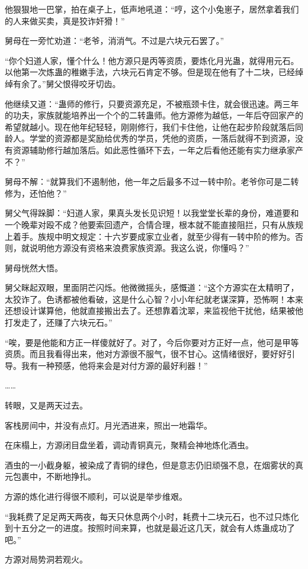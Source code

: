 \begin{this_body}
他狠狠地一巴掌，拍在桌子上，低声地吼道：“哼，这个小兔崽子，居然拿着我们的人来做买卖，真是狡诈奸猾！”

舅母在一旁忙劝道：“老爷，消消气。不过是六块元石罢了。”

“你个妇道人家，懂个什么！他方源只是丙等资质，要炼化月光蛊，就得用元石。以他第一次炼蛊的稚嫩手法，六块元石肯定不够。但是现在他有了十二块，已经绰绰有余了。”舅父恨得咬牙切齿。

他继续又道：“蛊师的修行，只要资源充足，不被瓶颈卡住，就会很迅速。两三年的功夫，家族就能培养出一个个的二转蛊师。他方源修为越低，一年后夺回家产的希望就越小。现在他年纪轻轻，刚刚修行，我们卡住他，让他在起步阶段就落后同龄人。学堂的资源都是奖励给优秀的学员，凭他的资质，一落后就得不到资源，没有资源辅助修行越加落后。如此恶性循环下去，一年之后看他还能有实力继承家产不？”

舅母不解：“就算我们不遏制他，他一年之后最多不过一转中阶。老爷你可是二转修为，还怕他？”

舅父气得跺脚：“妇道人家，果真头发长见识短！以我堂堂长辈的身份，难道要和一个晚辈对殴不成？他要索回遗产，合情合理，根本就不能直接阻拦，只有从族规上着手。族规中明文规定：十六岁要成家立业者，就至少得有一转中阶的修为。否则，就说明他方源没有资格来浪费家族资源。我这么说，你懂吗？”

舅母恍然大悟。

舅父眯起双眼，里面阴芒闪烁。他微微摇头，感慨道：“这个方源实在太精明了，太狡诈了。色诱都被他看破，这是什么心智？小小年纪就老谋深算，恐怖啊！本来还想设计谋算他，他就直接搬出去了。还想靠着沈翠，来监视他干扰他，结果被他打发走了，还赚了六块元石。”

“唉，要是他能和方正一样傻就好了。对了，今后你要对方正好一点，他可是甲等资质。而且我看得出来，他对方源很不服气，很不甘心。这情绪很好，要好好引导。我有一种预感，他将来会是对付方源的最好利器！”

……

转眼，又是两天过去。

客栈房间中，并没有点灯。月光洒进来，照出一地霜华。

在床榻上，方源闭目盘坐着，调动青铜真元，聚精会神地炼化酒虫。

酒虫的一小截身躯，被染成了青铜的绿色，但是意志仍旧顽强不息，在烟雾状的真元包裹中，不断地挣扎。

方源的炼化进行得很不顺利，可以说是举步维艰。

“我耗费了足足两天两夜，每天只休息两个小时，耗费十二块元石，也不过只炼化到十五分之一的进度。按照时间来算，也就是最近这几天，就会有人炼蛊成功了吧。”

方源对局势洞若观火。


\end{this_body}
